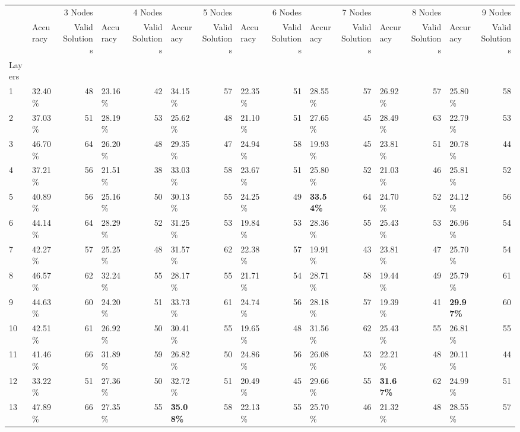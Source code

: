 \begin{tabular}{llrlrlrlrlrlrlr}
\toprule
 & \multicolumn{2}{r}{3 Nodes} & \multicolumn{2}{r}{4 Nodes} & \multicolumn{2}{r}{5 Nodes} & \multicolumn{2}{r}{6 Nodes} & \multicolumn{2}{r}{7 Nodes} & \multicolumn{2}{r}{8 Nodes} & \multicolumn{2}{r}{9 Nodes} \\
 & Accuracy & Valid Solutions & Accuracy & Valid Solutions & Accuracy & Valid Solutions & Accuracy & Valid Solutions & Accuracy & Valid Solutions & Accuracy & Valid Solutions & Accuracy & Valid Solutions \\
Layers &  &  &  &  &  &  &  &  &  &  &  &  &  &  \\
\midrule
1 & 32.40\% & 48 & 23.16\% & 42 & 34.15\% & 57 & 22.35\% & 51 & 28.55\% & 57 & 26.92\% & 57 & 25.80\% & 58 \\
2 & 37.03\% & 51 & 28.19\% & 53 & 25.62\% & 48 & 21.10\% & 51 & 27.65\% & 45 & 28.49\% & 63 & 22.79\% & 53 \\
3 & 46.70\% & 64 & 26.20\% & 48 & 29.35\% & 47 & 24.94\% & 58 & 19.93\% & 45 & 23.81\% & 51 & 20.78\% & 44 \\
4 & 37.21\% & 56 & 21.51\% & 38 & 33.03\% & 58 & 23.67\% & 51 & 25.80\% & 52 & 21.03\% & 46 & 25.81\% & 52 \\
5 & 40.89\% & 56 & 25.16\% & 50 & 30.13\% & 55 & 24.25\% & 49 & \textbf{33.54\%} & 64 & 24.70\% & 52 & 24.12\% & 56 \\
6 & 44.14\% & 64 & 28.29\% & 52 & 31.25\% & 53 & 19.84\% & 53 & 28.36\% & 55 & 25.43\% & 53 & 26.96\% & 54 \\
7 & 42.27\% & 57 & 25.25\% & 48 & 31.57\% & 62 & 22.38\% & 57 & 19.91\% & 43 & 23.81\% & 47 & 25.70\% & 54 \\
8 & 46.57\% & 62 & 32.24\% & 55 & 28.17\% & 55 & 21.71\% & 54 & 28.71\% & 58 & 19.44\% & 49 & 25.79\% & 61 \\
9 & 44.63\% & 60 & 24.20\% & 51 & 33.73\% & 61 & 24.74\% & 56 & 28.18\% & 57 & 19.39\% & 41 & \textbf{29.97\%} & 60 \\
10 & 42.51\% & 61 & 26.92\% & 50 & 30.41\% & 55 & 19.65\% & 48 & 31.56\% & 62 & 25.43\% & 55 & 26.81\% & 55 \\
11 & 41.46\% & 66 & 31.89\% & 59 & 26.82\% & 50 & 24.86\% & 56 & 26.08\% & 53 & 22.21\% & 48 & 20.11\% & 44 \\
12 & 33.22\% & 51 & 27.36\% & 50 & 32.72\% & 51 & 20.49\% & 45 & 29.66\% & 55 & \textbf{31.67\%} & 62 & 24.99\% & 51 \\
13 & 47.89\% & 66 & 27.35\% & 55 & \textbf{35.08\%} & 58 & 22.13\% & 55 & 25.70\% & 46 & 21.32\% & 48 & 28.55\% & 57 \\

\end{tabular}
